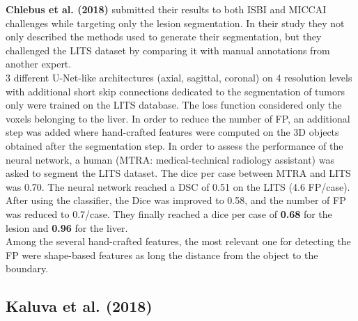 \textbf{Chlebus et al. (2018)} submitted their results to both ISBI and
MICCAI challenges while targeting only the lesion segmentation. In their
study they not only described the methods used to generate their
segmentation, but they challenged the LITS dataset by comparing it with
manual annotations from another expert.\\
3 different U-Net-like architectures (axial, sagittal, coronal) on 4
resolution levels with additional short skip connections dedicated to
the segmentation of tumors only were trained on the LITS database. The
loss function considered only the voxels belonging to the liver. In
order to reduce the number of FP, an additional step was added where
hand-crafted features were computed on the 3D objects obtained after the
segmentation step. In order to assess the performance of the neural
network, a human (MTRA: medical-technical radiology assistant) was asked
to segment the LITS dataset. The dice per case between MTRA and LITS was
0.70. The neural network reached a DSC of 0.51 on the LITS (4.6
FP/case). After using the classifier, the Dice was improved to 0.58, and
the number of FP was reduced to 0.7/case. They finally reached a dice
per case of \textbf{0.68} for the lesion and \textbf{0.96} for the
liver.\\
Among the several hand-crafted features, the most relevant one for
detecting the FP were shape-based features as long the distance from the
object to the boundary.

\subsection{Kaluva et al. (2018)}\label{kaluva-et-al.-2018}

